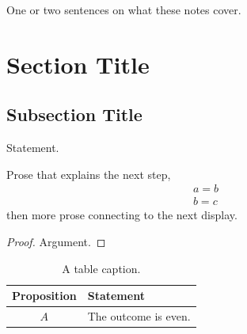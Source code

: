 \documentclass[12pt]{article}
\begin{document}

\begin{intro}
One or two sentences on what these notes cover.
\end{intro}

\section{Section Title}

\subsection{Subsection Title}
\begin{theorem}
Statement.
\end{theorem}

Prose that explains the next step,
\begin{gather}
    a = b \\
    b = c
\end{gather}
then more prose connecting to the next display.

\begin{proof}
Argument.
\end{proof}

\begin{table}[h]
\centering
\begin{tabular}{|c|l|}
\hline
Proposition & Statement \\ \hline
$A$ & The outcome is even. \\ \hline
\end{tabular}
\caption{A table caption.}
\end{table}
\end{document}
